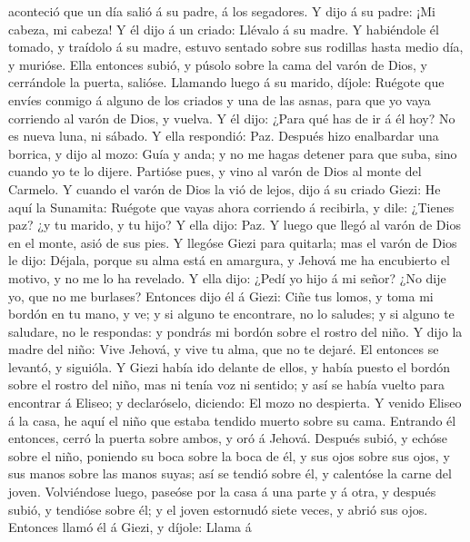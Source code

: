 aconteció que un día salió á su padre, á los segadores. 
Y dijo á su padre: ¡Mi cabeza, mi cabeza! Y él dijo á un criado: Llévalo
á su madre.  Y habiéndole él tomado, y traídolo á su
madre, estuvo sentado sobre sus rodillas hasta medio día, y murióse.
 Ella entonces subió, y púsolo sobre la cama del varón de
Dios, y cerrándole la puerta, salióse.  Llamando luego á
su marido, díjole: Ruégote que envíes conmigo á alguno de los criados y
una de las asnas, para que yo vaya corriendo al varón de Dios, y vuelva.
 Y él dijo: ¿Para qué has de ir á él hoy? No es nueva
luna, ni sábado. Y ella respondió: Paz.  Después hizo
enalbardar una borrica, y dijo al mozo: Guía y anda; y no me hagas
detener para que suba, sino cuando yo te lo dijere. 
Partióse pues, y vino al varón de Dios al monte del Carmelo. Y cuando el
varón de Dios la vió de lejos, dijo á su criado Giezi: He aquí la
Sunamita:  Ruégote que vayas ahora corriendo á recibirla,
y dile: ¿Tienes paz? ¿y tu marido, y tu hijo? Y ella dijo: Paz.
 Y luego que llegó al varón de Dios en el monte, asió de
sus pies. Y llegóse Giezi para quitarla; mas el varón de Dios le dijo:
Déjala, porque su alma está en amargura, y Jehová me ha encubierto el
motivo, y no me lo ha revelado.  Y ella dijo: ¿Pedí yo
hijo á mi señor? ¿No dije yo, que no me burlases? 
Entonces dijo él á Giezi: Ciñe tus lomos, y toma mi bordón en tu mano, y
ve; y si alguno te encontrare, no lo saludes; y si alguno te saludare,
no le respondas: y pondrás mi bordón sobre el rostro del niño.
 Y dijo la madre del niño: Vive Jehová, y vive tu alma,
que no te dejaré.  El entonces se levantó, y siguióla. Y
Giezi había ido delante de ellos, y había puesto el bordón sobre el
rostro del niño, mas ni tenía voz ni sentido; y así se había vuelto para
encontrar á Eliseo; y declaróselo, diciendo: El mozo no despierta.
 Y venido Eliseo á la casa, he aquí el niño que estaba
tendido muerto sobre su cama.  Entrando él entonces,
cerró la puerta sobre ambos, y oró á Jehová.  Después
subió, y echóse sobre el niño, poniendo su boca sobre la boca de él, y
sus ojos sobre sus ojos, y sus manos sobre las manos suyas; así se
tendió sobre él, y calentóse la carne del joven. 
Volviéndose luego, paseóse por la casa á una parte y á otra, y después
subió, y tendióse sobre él; y el joven estornudó siete veces, y abrió
sus ojos.  Entonces llamó él á Giezi, y díjole: Llama á
